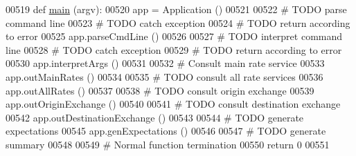 \begin{DoxyCode}
00519 \textcolor{keyword}{def }\hyperlink{namespacee2e_afb3e7d384688a07b72e1df5201192375}{main} (argv):
00520     app = Application ()
00521     
00522     \textcolor{comment}{# TODO parse command line }
00523     \textcolor{comment}{# TODO catch exception}
00524     \textcolor{comment}{# TODO return according to error}
00525     app.parseCmdLine ()
00526     
00527     \textcolor{comment}{# TODO interpret command line }
00528     \textcolor{comment}{# TODO catch exception}
00529     \textcolor{comment}{# TODO return according to error}
00530     app.interpretArgs ()
00531     
00532     \textcolor{comment}{# Consult main rate service}
00533     app.outMainRates ()
00534     
00535     \textcolor{comment}{# TODO consult all rate services}
00536     app.outAllRates ()
00537     
00538     \textcolor{comment}{# TODO consult origin exchange }
00539     app.outOriginExchange ()
00540     
00541     \textcolor{comment}{# TODO consult destination exchange}
00542     app.outDestinationExchange ()
00543     
00544     \textcolor{comment}{# TODO generate expectations}
00545     app.genExpectations ()
00546     
00547     \textcolor{comment}{# TODO generate summary}
00548 
00549     \textcolor{comment}{# Normal function termination}
00550     \textcolor{keywordflow}{return} 0
00551 
\end{DoxyCode}
